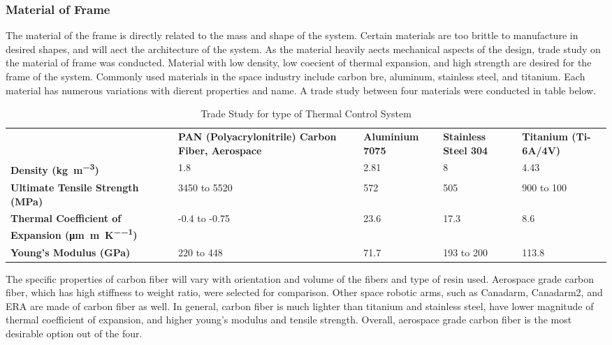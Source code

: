 \subsubsection{Material of Frame}
\label{sect:materialto}
The material of the frame is directly related to the mass and shape of the system. Certain materials are too brittle to manufacture in desired shapes, and will aect the architecture of the system. As the material heavily aects mechanical aspects of the design, trade study on the material of frame was conducted. Material with low density, low coecient of thermal expansion, and high strength are desired for the frame of the system. Commonly used materials in the space industry include carbon bre, aluminum, stainless steel, and titanium. Each material has numerous variations with dierent properties and name. A trade study between four materials were conducted in table below.

\begin{table}[H]
\centering
\caption{Trade Study for type of Thermal Control System}
\begin{tabular}{|P{3.6cm}|P{3.1cm}|P{2.4cm}|P{2.3cm}|P{2.5cm}|}
\hline
	&	\textbf{PAN (Polyacrylonitrile) Carbon Fiber, Aerospace \cite{carbonfibreprop}}	&\textbf{Aluminium 7075 \cite{alumniumprop}}	&	\textbf{Stainless Steel 304 \cite{steelprop}}	&	\textbf{Titanium (Ti-6A/4V) \cite{titaniumprop}}	\\\hhline{|=|=|=|=|=|}
\textbf{Density (\si{\kilo\gram\per\metre\cubed})}	&	
1.8	&	2.81	&	8	&	4.43	\\\hline
\textbf{Ultimate Tensile Strength (\si{\mega\pascal})}	&
3450 to 5520	&	572	&	505	&	900 to 100	\\\hline
\textbf{Thermal Coefficient of Expansion (\si{\micro\metre\per\metre\per\kelvin})}	&	
-0.4 to -0.75	&	23.6	&	17.3	&	8.6	\\\hline
\textbf{Young's Modulus (\si{\giga\pascal})}	&
220 to 448	&	71.7	&	193 to 200	&	113.8	\\\hline
\end{tabular}
\label{table:materialto}
\end{table}

The specific properties of carbon fiber will vary with orientation and volume of the fibers and type of resin used. Aerospace grade carbon fiber, which has high stiffness to weight ratio, were selected for comparison. Other space robotic arms, such as Canadarm, Canadarm2, and ERA are made of carbon fiber as well. In general, carbon fiber is much lighter than titanium and stainless steel, have lower magnitude of thermal coefficient of expansion, and higher young’s modulus and tensile strength. Overall, aerospace grade carbon fiber is the most desirable option out of the four.

